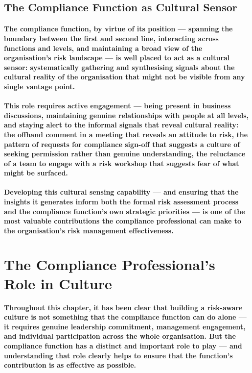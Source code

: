 \subsection{The Compliance Function as Cultural Sensor}
\paragraph{The compliance function, by virtue of its position — spanning the boundary between the first and second line, interacting across functions and levels, and maintaining a broad view of the organisation's risk landscape — is well placed to act as a \textbf{cultural sensor}: systematically gathering and synthesising signals about the cultural reality of the organisation that might not be visible from any single vantage point.}
\paragraph{This role requires active engagement — being present in business discussions, maintaining genuine relationships with people at all levels, and staying alert to the informal signals that reveal cultural reality: the offhand comment in a meeting that reveals an attitude to risk, the pattern of requests for compliance sign-off that suggests a culture of seeking permission rather than genuine understanding, the reluctance of a team to engage with a risk workshop that suggests fear of what might be surfaced.}
\paragraph{Developing this cultural sensing capability — and ensuring that the insights it generates inform both the formal risk assessment process and the compliance function's own strategic priorities — is one of the most valuable contributions the compliance professional can make to the organisation's risk management effectiveness.}

\section{The Compliance Professional's Role in Culture}
\paragraph{Throughout this chapter, it has been clear that building a risk-aware culture is not something that the compliance function can do alone — it requires genuine leadership commitment, management engagement, and individual participation across the whole organisation. But the compliance function has a distinct and important role to play — and understanding that role clearly helps to ensure that the function's contribution is as effective as possible.}

